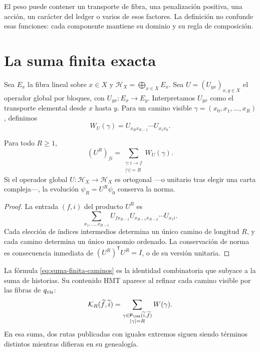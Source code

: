 El peso puede contener un transporte de fibra, una penalización positiva, una
acción, un carácter del ledger o varios de esos factores. La definición no
confunde esas funciones: cada componente mantiene su dominio y su regla de
composición.

\section{La suma finita exacta}

Sea \(E_x\) la fibra lineal sobre \(x\in X\) y
\(\mathcal H_X=\bigoplus_{x\in X}E_x\). Sea
\(U=(U_{yx})_{x,y\in X}\) el operador global por bloques, con
\(U_{yx}:E_x\to E_y\). Interpretamos \(U_{yx}\) como el transporte elemental
desde \(x\) hasta \(y\). Para un camino visible
\(\gamma=(x_0,x_1,\ldots,x_R)\), definimos
\[
 W_U(\gamma)=U_{x_Rx_{R-1}}\cdots U_{x_1x_0}.
\]

\begin{theorem}
\label{thm:suma-finita-caminos}
Para todo \(R\geq 1\),
\begin{equation}
 (U^R)_{fi}
 =\sum_{\substack{\gamma:i\to f\\|\gamma|=R}}W_U(\gamma).
 \label{eq:suma-finita-caminos}
\end{equation}
Si el operador global \(U:\mathcal H_X\to\mathcal H_X\) es ortogonal ---o
unitario tras elegir una carta compleja---, la
evolución \(\psi_R=U^R\psi_0\) conserva la norma.
\end{theorem}

\begin{proof}
La entrada \((f,i)\) del producto \(U^R\) es
\[
 \sum_{x_1,\ldots,x_{R-1}}
 U_{fx_{R-1}}U_{x_{R-1}x_{R-2}}\cdots U_{x_1i}.
\]
Cada elección de índices intermedios determina un único camino de longitud
\(R\), y cada camino determina un único monomio ordenado. La conservación de
norma es consecuencia inmediata de \((U^R)^{\mathsf T}U^R=I\), o de su versión
unitaria.
\end{proof}

La fórmula \eqref{eq:suma-finita-caminos} es la identidad combinatoria que
subyace a la suma de historias. Su contenido HMT aparece al refinar cada
camino visible por las fibras de \(q_{\rm vis}\):
\begin{equation}
 \mathcal K_R(\widetilde f,\widetilde i)
 =\sum_{\substack{\gamma\in
        \mathsf P_{\TPK}(\widetilde i,\widetilde f)\\|\gamma|=R}}
 W(\gamma).
 \label{eq:kernel-genealogico-finito}
\end{equation}
En esa suma, dos rutas publicadas con iguales extremos siguen siendo términos
distintos mientras difieran en su genealogía.

